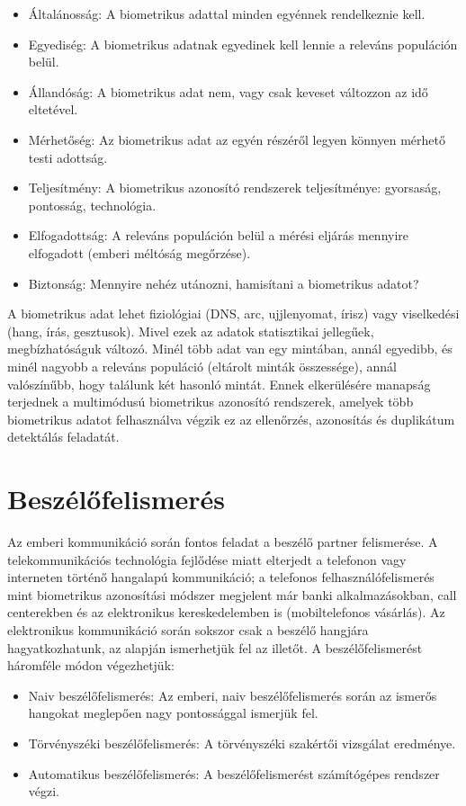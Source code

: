 \begin{itemize}
	\item Általánosság: A biometrikus adattal minden egyénnek rendelkeznie kell.
	\item Egyediség: A biometrikus adatnak egyedinek kell lennie a releváns populáción belül.
	\item Állandóság: A biometrikus adat nem, vagy csak keveset változzon az idő eltetével.
	\item Mérhetőség: Az biometrikus adat az egyén részéről legyen könnyen mérhető testi adottság.
	\item Teljesítmény: A biometrikus azonosító rendszerek teljesítménye: gyorsaság, pontosság, technológia.
	\item Elfogadottság: A releváns populáción belül a mérési eljárás mennyire elfogadott (emberi méltóság megőrzése).
	\item Biztonság: Mennyire nehéz utánozni, hamisítani a biometrikus adatot?
\end{itemize}

A biometrikus adat lehet fiziológiai (DNS, arc, ujjlenyomat, írisz) vagy viselkedési (hang, írás, gesztusok). Mivel ezek az adatok statisztikai jellegűek, megbízhatóságuk változó. Minél több adat van egy mintában, annál egyedibb, és minél nagyobb a releváns populáció (eltárolt minták összessége), annál valószínűbb, hogy találunk két hasonló mintát. Ennek elkerülésére manapság terjednek a multimódusú biometrikus azonosító rendszerek, amelyek több biometrikus adatot felhasználva végzik ez az ellenőrzés, azonosítás és duplikátum detektálás feladatát. 


\section{Beszélőfelismerés}

Az emberi kommunikáció során fontos feladat a beszélő partner felismerése. A telekommunikációs technológia fejlődése miatt elterjedt a telefonon vagy interneten történő hangalapú kommunikáció; a telefonos felhasználófelismerés mint biometrikus azonosítási módszer megjelent már banki alkalmazásokban, call centerekben és az elektronikus kereskedelemben is (mobiltelefonos vásárlás). Az elektronikus kommunikáció során sokszor csak a beszélő hangjára hagyatkozhatunk, az alapján ismerhetjük fel az illetőt. A beszélőfelismerést háromféle módon végezhetjük:

\begin{itemize}
	\item Naiv beszélőfelismerés: Az emberi, naiv beszélőfelismerés során az ismerős hangokat meglepően nagy pontossággal ismerjük fel.
	\item Törvényszéki beszélőfelismerés: A törvényszéki szakértői vizsgálat eredménye.
	\item Automatikus beszélőfelismerés: A beszélőfelismerést számítógépes rendszer végzi.
\end{itemize}

